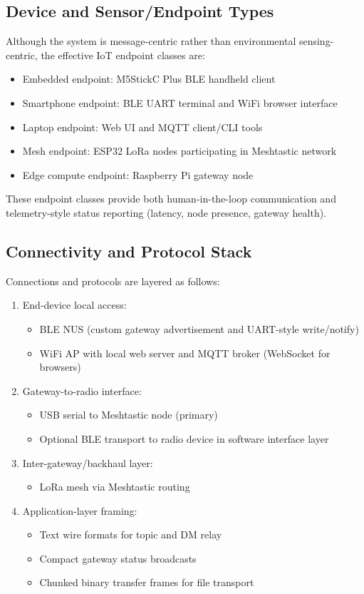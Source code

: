 \documentclass[conference]{IEEEtran}
\begin{document}
\subsection{Device and Sensor/Endpoint Types}
Although the system is message-centric rather than environmental sensing-centric, the effective IoT endpoint classes are:
\begin{itemize}
\item Embedded endpoint: M5StickC Plus BLE handheld client
\item Smartphone endpoint: BLE UART terminal and WiFi browser interface
\item Laptop endpoint: Web UI and MQTT client/CLI tools
\item Mesh endpoint: ESP32 LoRa nodes participating in Meshtastic network
\item Edge compute endpoint: Raspberry Pi gateway node
\end{itemize}

These endpoint classes provide both human-in-the-loop communication and telemetry-style status reporting (latency, node presence, gateway health).

\subsection{Connectivity and Protocol Stack}
Connections and protocols are layered as follows:
\begin{enumerate}
\item End-device local access:
\begin{itemize}
\item BLE NUS (custom gateway advertisement and UART-style write/notify)
\item WiFi AP with local web server and MQTT broker (WebSocket for browsers)
\end{itemize}
\item Gateway-to-radio interface:
\begin{itemize}
\item USB serial to Meshtastic node (primary)
\item Optional BLE transport to radio device in software interface layer
\end{itemize}
\item Inter-gateway/backhaul layer:
\begin{itemize}
\item LoRa mesh via Meshtastic routing
\end{itemize}
\item Application-layer framing:
\begin{itemize}
\item Text wire formats for topic and DM relay
\item Compact gateway status broadcasts
\item Chunked binary transfer frames for file transport
\end{itemize}
\end{enumerate}
\end{document}
